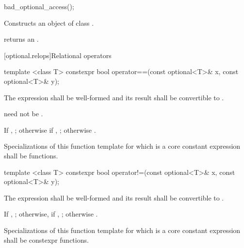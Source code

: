 %
%
\begin{itemdecl}
bad_optional_access();
\end{itemdecl}

\begin{itemdescr}
\pnum
\effects
Constructs an object of class .

\pnum
\postcondition
{} returns an
\ntbs.
\end{itemdescr}

[optional.relops]{Relational operators}

%
\begin{itemdecl}
template <class T> constexpr bool operator==(const optional<T>& x, const optional<T>& y);
\end{itemdecl}

\begin{itemdescr}
\pnum
\requires
The expression  shall be well-formed and
its result shall be convertible to .
\begin{note}  need not be . \end{note}

\pnum
\returns
If , ; otherwise if , ; otherwise .

\pnum
\remarks
Specializations of this function template
for which  is a core constant expression
shall be  functions.
\end{itemdescr}

%
\begin{itemdecl}
template <class T> constexpr bool operator!=(const optional<T>& x, const optional<T>& y);
\end{itemdecl}

\begin{itemdescr}
\pnum
\requires
The expression  shall be well-formed and
its result shall be convertible to .

\pnum
\returns
If , ;
otherwise, if , ;
otherwise .

\pnum
\remarks
Specializations of this function template
for which  is a core constant expression
shall be constexpr functions.
\end{itemdescr}

